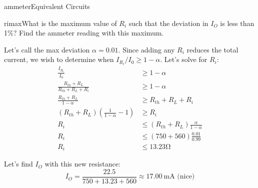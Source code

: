 \begin{mainquestion}{ammeter}{Equivalent Circuits}
\begin{partquestion}{rimax}{What is the maximum value of $R_{i}$ such that the deviation in $I_O$ is less than 1\%? Find the ammeter reading with this maximum.}
\begin{answer}
Let's call the max deviation $\alpha = 0.01$. Since adding any $R_i$ reduces the total current, we wish to determine when $I_{R_i}/I_{0} \geq 1-\alpha$. Let's solve for $R_i$:
\begin{align*}
    \frac{I_{R_i}}{I_0} &\geq 1-\alpha \\
    \frac{R_{th} + R_L}{R_{th} + R_L + R_i} &\geq 1-\alpha \\
    \frac{R_{th} + R_L}{1-\alpha} &\geq R_{th} + R_L + R_i \\
    (R_{th} + R_L)(\frac{1}{1-\alpha} - 1) &\geq R_i \\
    R_i &\leq (R_{th} + R_L)\frac{\alpha}{1-\alpha} \\
    R_i &\leq (750 + 560)\frac{0.01}{0.99} \\
    R_i &\leq 13.23\unit{\ohm}
\end{align*}

Let's find $I_O$ with this new resistance:
\[
I_O = \frac{22.5}{750 + 13.23 + 560} \approx 17.00~\text{mA (nice)}
\]

\end{answer}
\end{partquestion}

\end{mainquestion}
